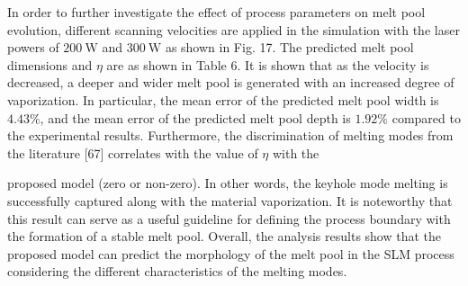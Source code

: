 \documentclass[10pt]{article}
\begin{document}
In order to further investigate the effect of process parameters on melt pool evolution, different scanning velocities are applied in the simulation with the laser powers of $200 \mathrm{~W}$ and $300 \mathrm{~W}$ as shown in Fig. 17. The predicted melt pool dimensions and $\eta$ are as shown in Table 6. It is shown that as the velocity is decreased, a deeper and wider melt pool is generated with an increased degree of vaporization. In particular, the mean error of the predicted melt pool width is $4.43 \%$, and the mean error of the predicted melt pool depth is $1.92 \%$ compared to the experimental results. Furthermore, the discrimination of melting modes from the literature [67] correlates with the value of $\eta$ with the

proposed model (zero or non-zero). In other words, the keyhole mode melting is successfully captured along with the material vaporization. It is noteworthy that this result can serve as a useful guideline for defining the process boundary with the formation of a stable melt pool. Overall, the analysis results show that the proposed model can predict the morphology of the melt pool in the SLM process considering the different characteristics of the melting modes.
\end{document}

